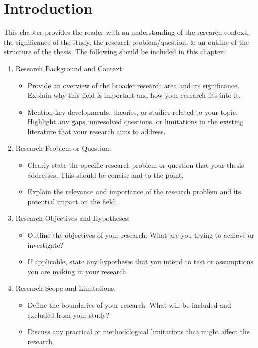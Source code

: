 \chapter{Introduction}
\label{Chapter:intro} 

This chapter provides the reader with an understanding of the research context, the significance of the study, the research problem/question, \& an outline of the structure of the thesis. The following  should be included in this chapter:

\begin{enumerate}

\item Research Background and Context:

	\begin{itemize}
	\item Provide an overview of the broader research area and its significance. Explain why this field is important and how your research fits into it.
	\item Mention key developments, theories, or studies related to your topic.
	 Highlight any gaps, unresolved questions, or limitations in the existing literature that your research aims to address.
   	\end{itemize}

\item Research Problem or Question:
	\begin{itemize}	
	\item Clearly state the specific research problem or question that your thesis addresses. This should be concise and to the point.
	\item Explain the relevance and importance of the research problem and its potential impact on the field.
   \end{itemize}

\item Research Objectives and Hypotheses:
	\begin{itemize}	
	\item Outline the objectives of your research. What are you trying to achieve or investigate?
	\item If applicable, state any hypotheses that you intend to test or assumptions you are making in your research.
	   \end{itemize}

\item Research Scope and Limitations:
	\begin{itemize}	
	\item  Define the boundaries of your research. What will be included and excluded from your study?
	\item Discuss any practical or methodological limitations that might affect the research.
	   \end{itemize}


\end{enumerate}
